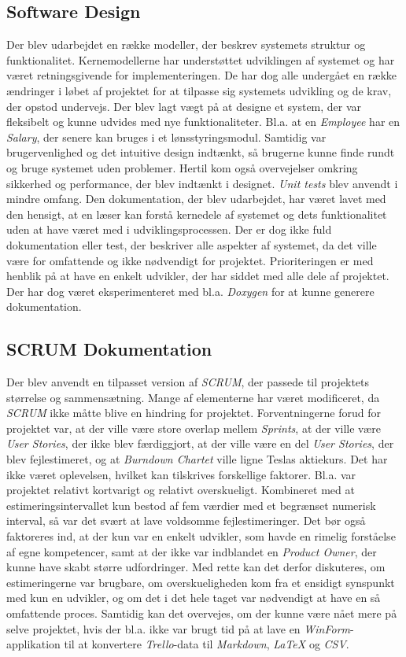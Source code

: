 \subsection{Software Design}
Der blev udarbejdet en række modeller, der beskrev systemets struktur og funktionalitet. Kernemodellerne har understøttet udviklingen af systemet og har været retningsgivende for implementeringen.
De har dog alle undergået en række ændringer i løbet af projektet for at tilpasse sig systemets udvikling og de krav, der opstod undervejs.
Der blev lagt vægt på at designe et system, der var fleksibelt og kunne udvides med nye funktionaliteter. Bl.a. at en \emph{Employee} har en \emph{Salary}, der senere kan bruges i et lønsstyringsmodul.
Samtidig var brugervenlighed og det intuitive design indtænkt, så brugerne kunne finde rundt og bruge systemet uden problemer.
Hertil kom også overvejelser omkring sikkerhed og performance, der blev indtænkt i designet. \emph{Unit tests} blev anvendt i mindre omfang.
Den dokumentation, der blev udarbejdet, har været lavet med den hensigt, at en læser kan forstå kernedele af systemet og dets funktionalitet uden at have været med i udviklingsprocessen.
Der er dog ikke fuld dokumentation eller test, der beskriver alle aspekter af systemet, da det ville være for omfattende og ikke nødvendigt for projektet.
Prioriteringen er med henblik på at have en enkelt udvikler, der har siddet med alle dele af projektet.
Der har dog været eksperimenteret med bl.a. \emph{Doxygen} for at kunne generere dokumentation.

\subsection{SCRUM Dokumentation}
Der blev anvendt en tilpasset version af \emph{SCRUM}, der passede til projektets størrelse og sammensætning. Mange af elementerne har været modificeret, da \emph{SCRUM} ikke måtte blive en hindring for projektet.
Forventningerne forud for projektet var, at der ville være store overlap mellem \emph{Sprints}, at der ville være \emph{User Stories}, der ikke blev færdiggjort, at der ville være en del \emph{User Stories}, der blev fejlestimeret, og at \emph{Burndown Chartet} ville ligne Teslas aktiekurs.
Det har ikke været oplevelsen, hvilket kan tilskrives forskellige faktorer. Bl.a. var projektet relativt kortvarigt og relativt overskueligt. 
Kombineret med at estimeringsintervallet kun bestod af fem værdier med et begrænset numerisk interval, så var det svært at lave voldsomme fejlestimeringer. 
Det bør også faktoreres ind, at der kun var en enkelt udvikler, som havde en rimelig forståelse af egne kompetencer, samt at der ikke var indblandet en \emph{Product Owner}, der kunne have skabt større udfordringer.
Med rette kan det derfor diskuteres, om estimeringerne var brugbare, om overskueligheden kom fra et ensidigt synspunkt med kun en udvikler, og om det i det hele taget var nødvendigt at have en så omfattende proces.
Samtidig kan det overvejes, om der kunne være nået mere på selve projektet, hvis der bl.a. ikke var brugt tid på at lave en \emph{WinForm}-applikation til at konvertere \emph{Trello}-data til \emph{Markdown}, \emph{LaTeX} og \emph{CSV}.

